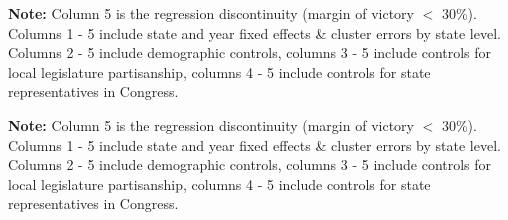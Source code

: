 \documentclass{article}
\begin{document}

\textbf{Note:} Column 5 is the regression discontinuity (margin of victory $<$ 30\%). Columns 1 - 5 include state and year fixed effects \& cluster errors by state level. Columns 2 - 5 include demographic controls, columns 3 - 5 include controls for local legislature partisanship, columns 4 - 5 include controls for state representatives in Congress.


\textbf{Note:} Column 5 is the regression discontinuity (margin of victory $<$ 30\%). Columns 1 - 5 include state and year fixed effects \& cluster errors by state level. Columns 2 - 5 include demographic controls, columns 3 - 5 include controls for local legislature partisanship, columns 4 - 5 include controls for state representatives in Congress.
\end{document}
